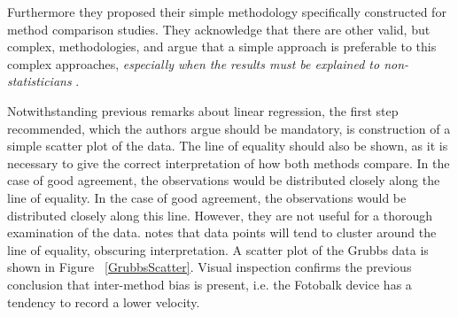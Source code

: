 \documentclass[12pt, a4paper]{report}
\theoremstyle{plain}
\theoremstyle{definition}
\theoremstyle{remark}
\begin{document}
Furthermore they proposed their simple methodology specifically constructed for method comparison studies. They acknowledge that there are other valid, but complex, methodologies, and argue that
		a simple approach is preferable to this complex approaches,
		\emph{especially when the results must be explained to
			non-statisticians} \citep*{BA83}.
		
		

	
	
	Notwithstanding previous remarks about linear regression, the first step recommended, which the authors argue should be mandatory, is construction of a simple scatter plot of the data. The line of equality should also be shown, as it is necessary to give the correct interpretation of how both methods compare. In the case of good agreement, the observations would be distributed closely along the line of equality. In the case of good agreement, the observations would be distributed closely along this line. However, they are not useful for a thorough examination of the data. \citet{BritHypSoc} notes that data points will tend to cluster around the line of equality, obscuring interpretation. A scatter plot of the Grubbs data is shown in Figure ~\ref{GrubbsScatter}. Visual inspection confirms the previous conclusion that inter-method bias is present, i.e. the Fotobalk device has a tendency to record a lower velocity.
	
\end{document}
